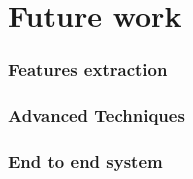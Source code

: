 \chapter{Future work}
\label{chap-future_work}

\subsection{Features extraction}

\subsection{Advanced Techniques}

\subsection{End to end system}
